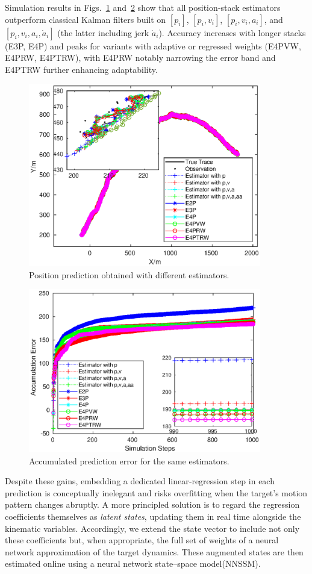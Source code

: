 \documentclass[sn-nature]{sn-jnl}%
\theoremstyle{thmstyleone}%
\theoremstyle{thmstyletwo}%
\theoremstyle{thmstylethree}%
\begin{document}
\medskip
Simulation results in Figs.~\ref{fig:pos_pred} and~\ref{fig:acc_err} show that all position‐stack estimators outperform classical Kalman filters built on  
\([p_i]\), \([p_i,v_i]\), \([p_i,v_i,a_i]\), and \([p_i,v_i,a_i,\dot a_i]\) (the latter including jerk \(\dot a_i\)).  
Accuracy increases with longer stacks (E3P, E4P) and peaks for variants with adaptive or regressed weights (E4PVW, E4PRW, E4PTRW), with E4PRW notably narrowing the error band and E4PTRW further enhancing adaptability.

\begin{figure}[!t]
  \centering
  \includegraphics[width=4in]{fig/fig1_1.eps}
  \caption{Position prediction obtained with different estimators.}
  \label{fig:pos_pred}
\end{figure}

\begin{figure}[!t]
  \centering
  \includegraphics[width=4in]{fig/fig1_2.eps}
  \caption{Accumulated prediction error for the same estimators.}
  \label{fig:acc_err}
\end{figure}

\medskip
Despite these gains, embedding a dedicated linear‐regression step in each prediction is conceptually inelegant and risks overfitting when the target’s motion pattern changes abruptly.  A more principled solution is to regard the regression coefficients themselves as \emph{latent states}, updating them in real time alongside the kinematic variables.  Accordingly, we extend the state vector to include not only these coefficients but, when appropriate, the full set of weights of a neural network approximation of the target dynamics.  These augmented states are then estimated online using a neural network state–space model(NNSSM).
\end{document}
